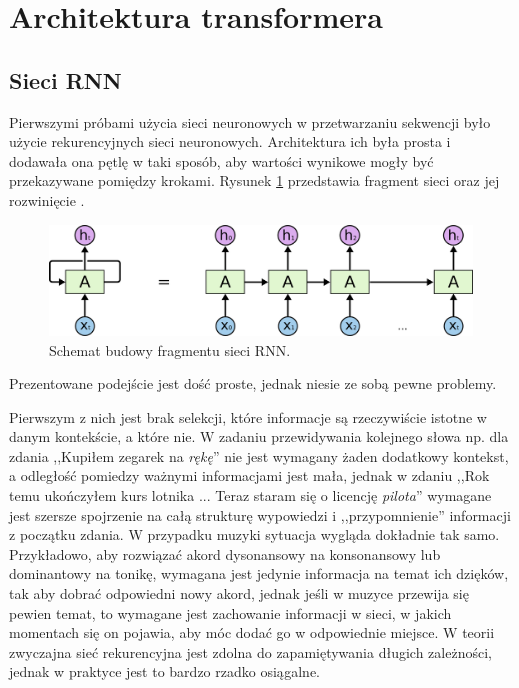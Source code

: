 \documentclass[data-science]{agh-wi} %
\begin{document}
\section{Architektura transformera}
\subsection{Sieci RNN}
Pierwszymi próbami użycia sieci neuronowych w przetwarzaniu sekwencji było użycie rekurencyjnych sieci neuronowych. Architektura ich była prosta i dodawała ona pętlę w taki sposób, aby wartości wynikowe mogły być przekazywane pomiędzy krokami. Rysunek \ref*{fig:rnn_scheme} przedstawia fragment sieci oraz jej rozwinięcie \cite{Understanding_lstm}.
\begin{figure}[ht!]
    \begin{center}
        \includegraphics[width=0.7\linewidth]{./img/rnn_scheme.png}
    \end{center}
    \caption{Schemat budowy fragmentu sieci RNN.}\label{fig:rnn_scheme}
\end{figure}

Prezentowane podejście jest dość proste, jednak niesie ze sobą pewne problemy.

Pierwszym z nich jest brak selekcji, które informacje są rzeczywiście istotne w danym kontekście, a które nie. W zadaniu przewidywania kolejnego słowa np. dla zdania ,,Kupiłem zegarek na \textit{rękę}'' nie jest wymagany żaden dodatkowy kontekst, a odległość pomiedzy ważnymi informacjami jest mała, jednak w zdaniu ,,Rok temu ukończyłem kurs lotnika ... Teraz staram się o licencję \textit{pilota}'' wymagane jest szersze spojrzenie na całą strukturę wypowiedzi i ,,przypomnienie'' informacji z początku zdania. W przypadku muzyki sytuacja wygląda dokładnie tak samo. Przykładowo, aby rozwiązać akord dysonansowy na konsonansowy lub dominantowy na tonikę, wymagana jest jedynie informacja na temat ich dzięków, tak aby dobrać odpowiedni nowy akord, jednak jeśli w muzyce przewija się pewien temat, to wymagane jest zachowanie informacji w sieci, w jakich momentach się on pojawia, aby móc dodać go w odpowiednie miejsce. W teorii zwyczajna sieć rekurencyjna jest zdolna do zapamiętywania długich zależności, jednak w praktyce jest to bardzo rzadko osiągalne.
\end{document}
